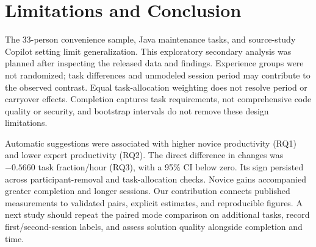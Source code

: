 \section{Limitations and Conclusion}
\label{sec:limitations}
The 33-person convenience sample, Java maintenance tasks, and source-study
Copilot setting limit generalization. This exploratory secondary analysis was
planned after inspecting the released data and findings. Experience groups
were not randomized; task differences and unmodeled session period may
contribute to the observed contrast. Equal task-allocation weighting does not
resolve period or carryover effects. Completion captures task requirements,
not comprehensive code quality or security, and bootstrap intervals do not
remove these design limitations.

Automatic suggestions were associated with higher novice productivity
(RQ1) and lower expert productivity (RQ2). The direct difference in changes
was $-0.5660$ task fraction/hour (RQ3), with a 95\% CI below zero. Its sign
persisted across participant-removal and task-allocation checks. Novice gains
accompanied greater completion and longer sessions. Our contribution connects
published measurements to validated pairs, explicit estimates, and reproducible
figures. A next study should repeat the paired mode comparison on additional
tasks, record first/second-session labels, and assess solution quality alongside
completion and time.
